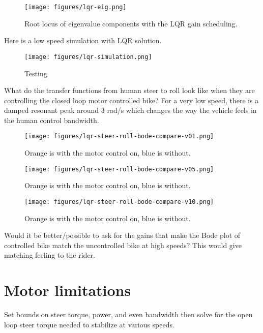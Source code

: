 \documentclass[12pt]{article}
\begin{document}
\begin{figure}
  \centering
  \texttt{[image: figures/lqr-eig.png]}
  \caption{Root locus of eigenvalue components with the LQR gain scheduling.}
  \label{fig:lqr-eig}
\end{figure}

Here is a low speed simulation with LQR solution.

\begin{figure}
  \centering
  \texttt{[image: figures/lqr-simulation.png]}
  \caption{Testing}
  \label{fig:lqr-simulation}
\end{figure}

What do the transfer functions from human steer to roll look like when they are
controlling the closed loop motor controlled bike? For a very low speed, there
is a damped resonant peak around 3 rad/s which changes the way the vehicle
feels in the human control bandwidth.

\begin{figure}
  \centering
  \texttt{[image: figures/lqr-steer-roll-bode-compare-v01.png]}
  \caption{Orange is with the motor control on, blue is without.}
  \label{fig:lqr-steer-roll-bode-compare-v01}
\end{figure}

\begin{figure}
  \centering
  \texttt{[image: figures/lqr-steer-roll-bode-compare-v05.png]}
  \caption{Orange is with the motor control on, blue is without.}
  \label{fig:lqr-steer-roll-bode-compare-v05}
\end{figure}

\begin{figure}
  \centering
  \texttt{[image: figures/lqr-steer-roll-bode-compare-v10.png]}
  \caption{Orange is with the motor control on, blue is without.}
  \label{fig:lqr-steer-roll-bode-compare-v10}
\end{figure}

Would it be better/possible to ask for the gains that make the Bode plot of
controlled bike match the uncontrolled bike at high speeds? This would give
matching feeling to the rider.

\section{Motor limitations}

Set bounds on steer torque, power, and even bandwidth then solve for the open
loop steer torque needed to stabilize at various speeds.
\end{document}
